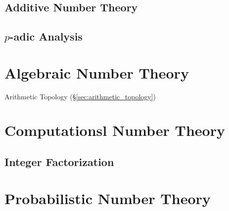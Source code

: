 \subsection{Additive Number Theory}\label{sec:additive_number_theory}

\subsection{$p$-adic Analysis}\label{sec:padic_analysis}



\section{Algebraic Number Theory}\label{sec:algebraic_number_theory}

Arithmetic Topology (\S\ref{sec:arithmetic_topology})



\section{Computationsl Number Theory}\label{sec:computational_number_theory}

\subsection{Integer Factorization}\label{sec:integer_factorization}



\section{Probabilistic Number Theory}\label{sec:probabilistic_number_theory}

